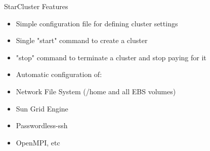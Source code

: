 \begin{frame}{StarCluster Features}
  \begin{itemize}
    \item Simple configuration file for defining cluster settings
    \item Single "start" command to create a cluster
    \item "stop" command to terminate a cluster and stop paying for it
    \item Automatic configuration of: 
    \item Network File System (/home and all EBS volumes)
    \item Sun Grid Engine
    \item Passwordless-ssh
    \item OpenMPI, etc
  \end{itemize}
\end{frame}
